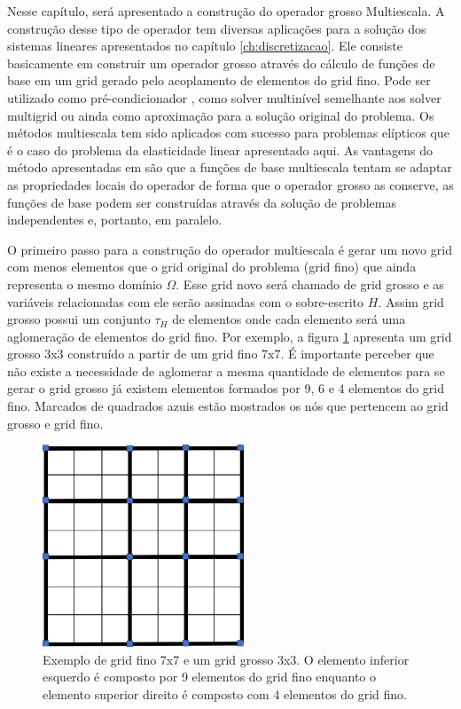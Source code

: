 
Nesse capítulo, será apresentado a construção do operador grosso Multiescala. A construção desse tipo de operador tem diversas aplicações para a solução dos sistemas lineares apresentados no capítulo \ref{ch:discretizacao}. Ele consiste basicamente em construir um operador grosso através do cálculo de funções de base em um grid gerado pelo acoplamento de elementos do grid fino. Pode ser utilizado como pré-condicionador \cite{casteletto}, como solver multinível semelhante aos solver multigrid ou ainda como aproximação para a solução original do problema. Os métodos multiescala tem sido aplicados com sucesso para problemas elípticos que é o caso do problema da elasticidade linear apresentado aqui. As vantagens do método apresentadas em \cite{thomashou} são que a funções de base multiescala tentam se adaptar as propriedades locais do operador de forma que o operador grosso as conserve, as funções de base podem ser construídas através da solução de problemas independentes e, portanto, em paralelo.

O primeiro passo para a construção do operador multiescala é gerar um novo grid com menos elementos que o grid original do problema (grid fino) que ainda representa o mesmo domínio $\Omega$. Esse grid novo será chamado de grid grosso e as variáveis relacionadas com ele serão assinadas com o sobre-escrito $H$. 
Assim grid grosso possui um conjunto $\tau_H$ de elementos onde cada elemento será uma aglomeração de elementos do grid fino. Por exemplo, a figura \ref{fig:gridgrosso} apresenta um grid grosso 3x3 construído a partir de um grid fino 7x7. É importante perceber que não existe a necessidade de aglomerar a mesma quantidade de elementos para se gerar o grid grosso já existem elementos formados por 9, 6 e 4 elementos do grid fino. Marcados de quadrados azuis estão mostrados os nós que pertencem ao grid grosso e grid fino.

\begin{figure}[!htbp]
\label{fig:gridgrosso}
\centering
\includegraphics[width=6cm]{chap06/figs/grosso.png}
\caption{Exemplo de grid fino 7x7 e um grid grosso 3x3. O elemento inferior esquerdo é composto por 9 elementos do grid fino enquanto o elemento superior direito é composto com 4 elementos do grid fino.}
\end{figure}


